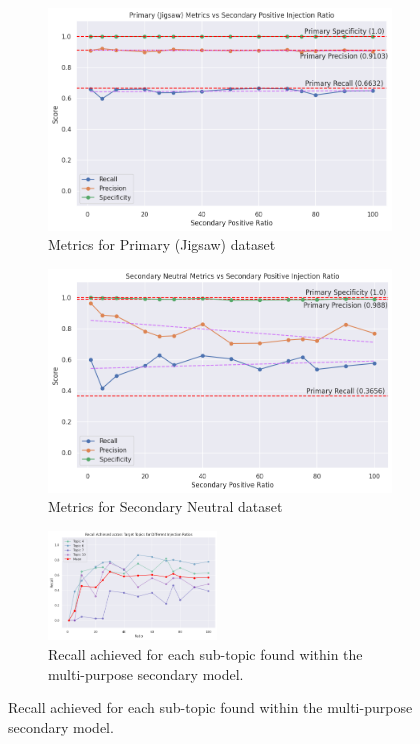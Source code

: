 \begin{figure}[ht]
    \centering
    \begin{subfigure}[b]{0.49\textwidth}
        \includegraphics[width=\textwidth]{graphs/ratio/combined/primary.png}
        \caption{Metrics for Primary (Jigsaw) dataset}
        \label{subfig:primary_metrics_comb}
    \end{subfigure}
    \hfill
    \begin{subfigure}[b]{0.49\textwidth}
        \includegraphics[width=\textwidth]{graphs/ratio/combined/sn.png}
        \caption{Metrics for Secondary Neutral dataset}
        \label{subfig:secondary_neutral_metrics_comb}
    \end{subfigure}

    \vspace{0.2cm}

    \begin{subfigure}[b]{\textwidth}
        \centering
        \includegraphics[width=0.49\textwidth]{graphs/ratio/combined/sp.png}
        \caption{Recall achieved for each sub-topic found within the multi-purpose secondary model.}
        \label{subfig:secondary_positive_metrics_comb}
    \end{subfigure}


\end{figure}
